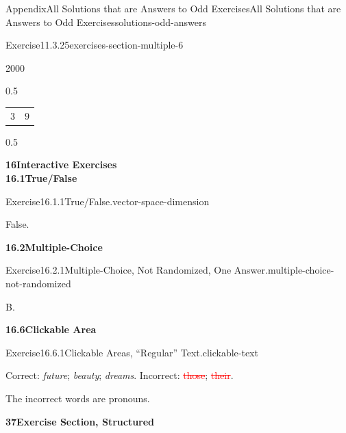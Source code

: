 \documentclass[twoside,10pt,]{article}
\newcommand{\deletethick}{.25ex}
\newcommand{\deleted}[1]{\renewcommand{\ULthickness}{\deletethick}\textcolor{red}{\sout{#1}}}
\numberwithin{equation}{section}
\begin{document}
\begin{solutions-section}{Appendix}{All Solutions that are Answers to Odd Exercises}{}{All Solutions that are Answers to Odd Exercises}{}{}{solutions-odd-answers}
\begin{divisionsolution}{Exercise}{11.3.25}{}{exercises-section-multiple-6}
\begin{sidebyside}{2}{0}{0}{0}
\begin{sbspanel}{0.5}
{{{\begin{tabular}{cc}
\(3\)&\(9\)
\end{tabular}
}%
\par}
}%
\end{sbspanel}%
\begin{sbspanel}{0.5}%
\noindent{}%
\end{sbspanel}%
\end{sidebyside}%
\end{divisionsolution}%
\par\medskip
\noindent\textbf{\large{}16\space\textperiodcentered\space{}Interactive Exercises\\
16.1\space\textperiodcentered\space{}True\slash{}False}
\begin{divisionsolution}{Exercise}{16.1.1}{True\slash{}False.}{vector-space-dimension}%
\par\smallskip%
\noindent\hypertarget{vector-space-dimension-5-back}{}False.%
\end{divisionsolution}%
\par\medskip
\noindent\textbf{\large{}16.2\space\textperiodcentered\space{}Multiple-Choice}
\begin{divisionsolution}{Exercise}{16.2.1}{Multiple-Choice, Not Randomized, One Answer.}{multiple-choice-not-randomized}%
\par\smallskip%
\noindent\hypertarget{multiple-choice-not-randomized-6-back}{}B.%
\end{divisionsolution}%
\par\medskip
\noindent\textbf{\large{}16.6\space\textperiodcentered\space{}Clickable Area}
\begin{divisionsolution}{Exercise}{16.6.1}{Clickable Areas, ``Regular'' Text.}{clickable-text}%
\par\smallskip%
\noindent\hypertarget{clickable-text-3-back}{}Correct: \emph{future}; \emph{beauty}; \emph{dreams}. Incorrect: \deleted{those}; \deleted{their}.%
\par
The incorrect words are pronouns.%
\end{divisionsolution}%
\par\medskip
\noindent\textbf{\large{}37\space\textperiodcentered\space{}Exercise Section, Structured}

\end{solutions-section}
\end{document}
